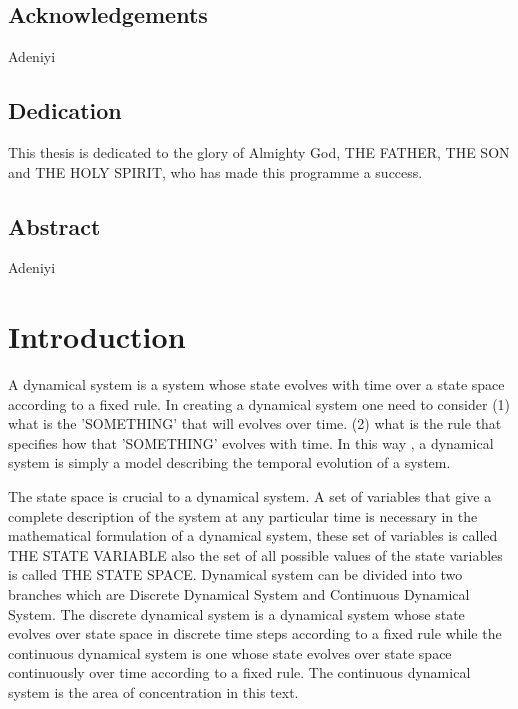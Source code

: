 \documentclass[a4paper,12pt]{report}
\numberwithin{equation}{section}
\begin{document}
\section*{Acknowledgements}
Adeniyi
\newpage
\section*{Dedication}
This thesis is dedicated to the glory of Almighty God, THE FATHER, THE SON and THE HOLY SPIRIT, who has made this programme a success.
\newpage
\begin{center}
\section*{Abstract}
\end{center}
Adeniyi
\newpage 
{}
\tableofcontents
\newpage
\listoftables
{}
\newpage
\listoffigures
{}
\newpage
{}
\chapter{Introduction}
A dynamical system is a system whose state evolves with time over a state space according to a fixed rule. In creating a dynamical system one need to consider
(1) what is the 'SOMETHING' that will evolves over time.  (2) what is the rule that specifies how that 'SOMETHING'  evolves with time. In this way , a dynamical system is simply a model describing the temporal evolution of a system.

The state space is crucial to a dynamical system. A set of variables that give a complete description of the system at any particular time is necessary in the mathematical formulation of a dynamical system, these set of variables is called THE STATE VARIABLE also the set of all possible values of the state variables is called THE STATE SPACE. Dynamical system can be divided into two branches which are Discrete Dynamical System and Continuous Dynamical System. The discrete dynamical system is a dynamical system whose state evolves over state space in discrete time steps according to a fixed rule while the continuous dynamical system is one whose state evolves over state space continuously over time according to a fixed rule. The continuous dynamical system is the area of concentration in this text.
\end{document}

